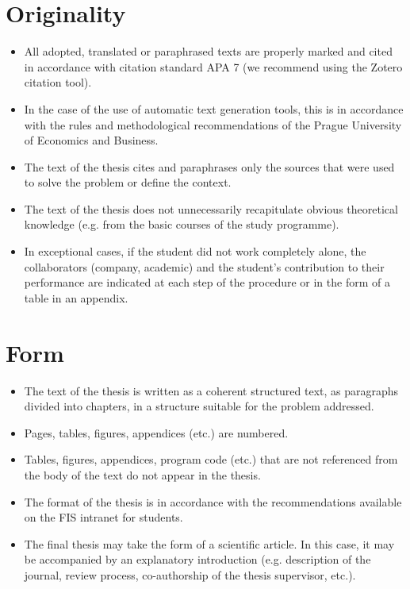 \section*{Originality}
\begin{itemize}
\item \vspace*{-2ex}All adopted, translated or paraphrased texts are properly marked and cited in accordance with citation standard APA 7 (we recommend using the Zotero citation tool).
\item In the case of the use of automatic text generation tools, this is in accordance with the rules and methodological recommendations of the Prague University of Economics and Business.
\item The text of the thesis cites and paraphrases only the sources that were used to solve the problem or define the context.
\item The text of the thesis does not unnecessarily recapitulate obvious theoretical knowledge (e.g. from the basic courses of the study programme).
\item In exceptional cases, if the student did not work completely alone, the collaborators (company, academic) and the student's contribution to their performance are indicated at each step of the procedure or in the form of a table in an appendix.
\end{itemize}

\section*{Form}
\begin{itemize}
\item \vspace*{-2ex}The text of the thesis is written as a coherent structured text, as paragraphs divided into chapters, in a structure suitable for the problem addressed.
\item Pages, tables, figures, appendices (etc.) are numbered.
\item Tables, figures, appendices, program code (etc.) that are not referenced from the body of the text do not appear in the thesis.
\item The format of the thesis is in accordance with the recommendations available on the FIS intranet for students.
\item The final thesis may take the form of a scientific article. In this case, it may be accompanied by an explanatory introduction (e.g. description of the journal, review process, co-authorship of the thesis supervisor, etc.).
\end{itemize}

